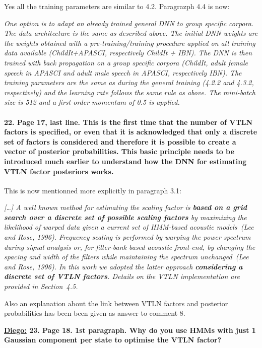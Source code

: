 \documentclass[]{article}
\begin{document}
Yes all the training parameters are similar to 4.2. Paragrazph 4.4 is now:

\textit{One option is to adapt an already trained general DNN  to group specific corpora. The data architecture is the same as described above. The initial DNN weights are the weights obtained with a pre-training/training procedure applied on all training data available  (ChildIt+APASCI, respectively ChildIt + IBN). The DNN is then trained with back propagation on a group specific corpora (ChildIt, adult female speech in APASCI and adult male speech in APASCI, respectively IBN). The training parameters are the same as during the general training (4.2.2 and 4.3.2, respectively) and the learning rate follows the same rule as above. The mini-batch size is 512 and a first-order momentum of 0.5 is applied.}

\paragraph{22. Page 17, last line. This is the first time that the number of VTLN factors is specified, or even that it is acknowledged that only a discrete set of factors is considered and therefore it is possible to create a vector of posterior probabilities. This basic principle needs to be introduced much earlier to understand how the DNN for estimating VTLN factor posteriors works.}

This is now mentionned more explicitly in paragraph 3.1: 

\textit{[\dots] A  well  known  method  for estimating  the scaling  factor is \textbf{ based on  a  grid search  over a  discrete set  of possible scaling  factors} by maximizing the likelihood  of warped data given  a  current set  of  HMM-based acoustic  models~(Lee and Rose, 1996). Frequency scaling  is performed by  warping the power  spectrum during signal  analysis  or, for  filter-bank  based  acoustic front-end,  by changing the  spacing and width  of the filters while  maintaining the spectrum  unchanged~(Lee and Rose, 1996). In  this  work we  adopted  the latter approach \textbf{considering a discrete set of VTLN factors}. Details on the VTLN implementation  are provided in Section~4.5.}

Also an explanation about the link between VTLN factors and posterior probabilities has been been given as answer to comment 8.

\textbf{\underline{Diego:} 23. Page 18. 1st paragraph. Why do you use HMMs with just 1 Gaussian component per state to optimise the VTLN factor? }
\end{document}
